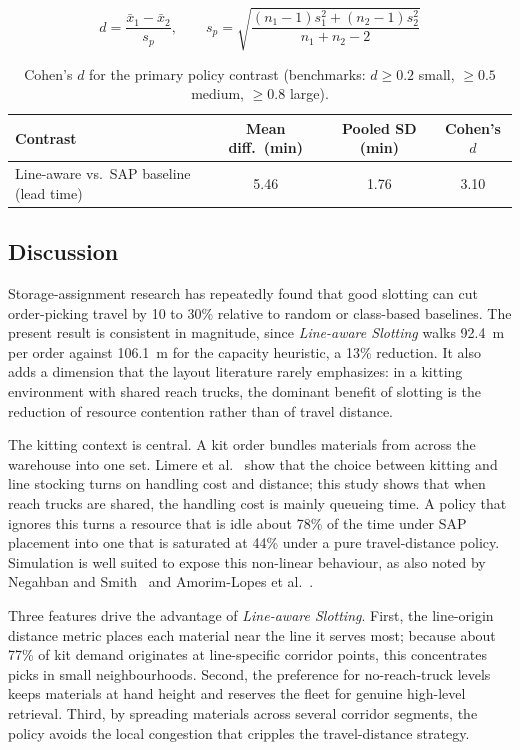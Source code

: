 \documentclass[12pt,a4paper]{article}
\newcommand{\policy}[1]{\textit{#1}}
\begin{document}
\begin{equation}
\label{eq:cohen}
d = \frac{\bar{x}_1 - \bar{x}_2}{s_p}, \qquad
s_p = \sqrt{\frac{(n_1-1)s_1^2 + (n_2-1)s_2^2}{n_1+n_2-2}}
\end{equation}

\begin{table}[htbp]
\centering
\caption{Cohen's $d$ for the primary policy contrast (benchmarks: $d\ge0.2$
small, $\ge0.5$ medium, $\ge0.8$ large).}
\label{tab:cohen}
\begin{tabular}{lccc}
\toprule
Contrast & Mean diff.\ (min) & Pooled SD (min) & Cohen's $d$ \\
\midrule
Line-aware vs.\ SAP baseline (lead time) & 5.46 & 1.76 & 3.10 \\
\bottomrule
\end{tabular}
\end{table}

\subsection{Discussion}
\label{sec:res-disc}
Storage-assignment research has repeatedly found that good slotting can cut
order-picking travel by 10 to 30\% relative to random or class-based
baselines. The present result is consistent in magnitude, since
\policy{Line-aware Slotting} walks 92.4~m per order against 106.1~m for the
capacity heuristic, a 13\% reduction. It also adds a dimension that the layout
literature rarely emphasizes: in a kitting environment with shared reach
trucks, the dominant benefit of slotting is the reduction of resource
contention rather than of travel distance.

The kitting context is central. A kit order bundles materials from across the
warehouse into one set. Limere et al.~\cite{limere2012} show that the choice
between kitting and line stocking turns on handling cost and distance; this
study shows that when reach trucks are shared, the handling cost is mainly
queueing time. A policy that ignores this turns a resource that is idle about
78\% of the time under SAP placement into one that is saturated at 44\% under
a pure travel-distance policy. Simulation is well suited to expose this
non-linear behaviour, as also noted by
Negahban and Smith~\cite{negahban2014} and Amorim-Lopes et
al.~\cite{amorim2021}.

Three features drive the advantage of \policy{Line-aware Slotting}. First, the
line-origin distance metric places each material near the line it serves most;
because about 77\% of kit demand originates at line-specific corridor points,
this concentrates picks in small neighbourhoods. Second, the preference for
no-reach-truck levels keeps materials at hand height and reserves the fleet
for genuine high-level retrieval. Third, by spreading materials across several
corridor segments, the policy avoids the local congestion that cripples the
travel-distance strategy.
\end{document}

